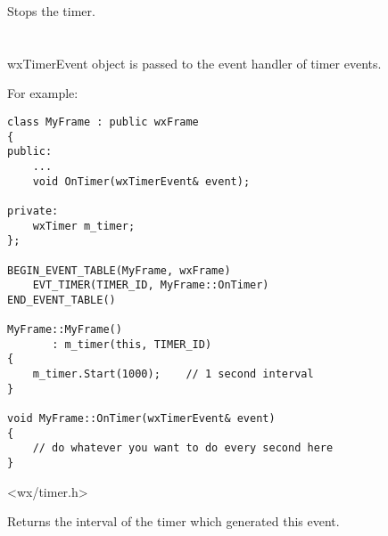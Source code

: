 \label{wxtimerstop}


Stops the timer.

\section{}\label{wxtimerevent}

wxTimerEvent object is passed to the event handler of timer events.

For example:

\begin{verbatim}
class MyFrame : public wxFrame
{
public:
    ...
    void OnTimer(wxTimerEvent& event);

private:
    wxTimer m_timer;
};

BEGIN_EVENT_TABLE(MyFrame, wxFrame)
    EVT_TIMER(TIMER_ID, MyFrame::OnTimer)
END_EVENT_TABLE()

MyFrame::MyFrame()
       : m_timer(this, TIMER_ID)
{
    m_timer.Start(1000);    // 1 second interval
}

void MyFrame::OnTimer(wxTimerEvent& event)
{
    // do whatever you want to do every second here
}

\end{verbatim}


<wx/timer.h>




\label{wxtimereventgetinterval}


Returns the interval of the timer which generated this event.

